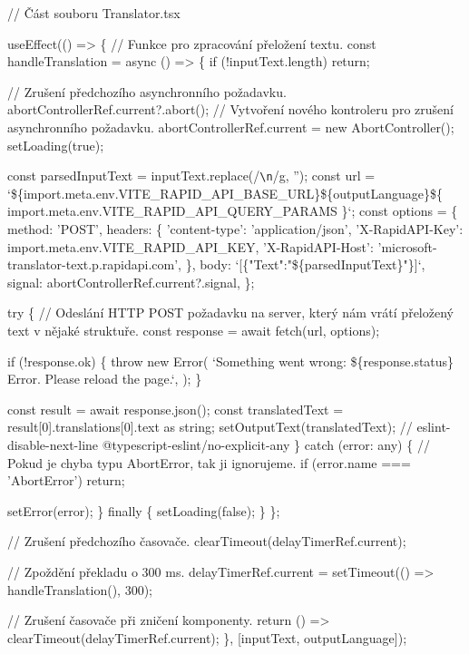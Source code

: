 \begin{prog}
// Část souboru Translator.tsx

useEffect(() => \{
  // Funkce pro zpracování přeložení textu.
  const handleTranslation = async () => \{
    if (!inputText.length) return;

    // Zrušení předchozího asynchronního požadavku.
    abortControllerRef.current?.abort();
    // Vytvoření nového kontroleru pro zrušení asynchronního požadavku.
    abortControllerRef.current = new AbortController();
    setLoading(true);

    const parsedInputText = inputText.replace(/\verb"\n"/g, '');
    const url = `\$\{import.meta.env.VITE_RAPID_API_BASE_URL\}\$\{outputLanguage\}\$\{
      import.meta.env.VITE_RAPID_API_QUERY_PARAMS
    \}`;
    const options = \{
      method: 'POST',
      headers: \{
        'content-type': 'application/json',
        'X-RapidAPI-Key': import.meta.env.VITE_RAPID_API_KEY,
        'X-RapidAPI-Host': 'microsoft-translator-text.p.rapidapi.com',
      \},
      body: `[\{"Text":"\$\{parsedInputText\}"\}]`,
      signal: abortControllerRef.current?.signal,
    \};

    try \{
      // Odeslání HTTP POST požadavku na server, 
        který nám vrátí přeložený text v nějaké struktuře.
      const response = await fetch(url, options);

      if (!response.ok) \{
        throw new Error(
          `Something went wrong: \$\{response.status\} Error.
          Please reload the page.`,
        );
      \}

      const result = await response.json();
      const translatedText = result[0].translations[0].text as string;
      setOutputText(translatedText);
      // eslint-disable-next-line @typescript-eslint/no-explicit-any
    \} catch (error: any) \{
      // Pokud je chyba typu AbortError, tak ji ignorujeme.
      if (error.name === 'AbortError') return;

      setError(error);
    \} finally \{
      setLoading(false);
    \}
  \};

  // Zrušení předchozího časovače.
  clearTimeout(delayTimerRef.current);

  // Zpoždění překladu o 300 ms.
  delayTimerRef.current = setTimeout(() => handleTranslation(), 300);

  // Zrušení časovače při zničení komponenty.
  return () => clearTimeout(delayTimerRef.current);
\}, [inputText, outputLanguage]);
\end{prog}

